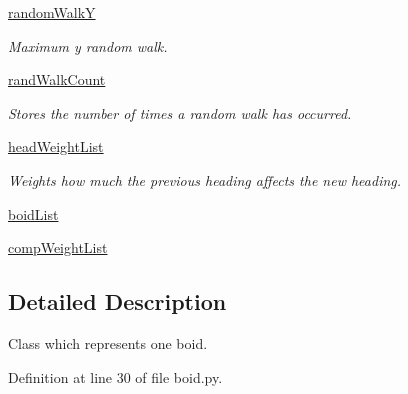 \begin{DoxyCompactItemize}
\hyperlink{classboid_1_1Boid_a1bf0149b7eadf9e6a0f08c93d95bac73}{random\-Walk\-Y}
\begin{DoxyCompactList}\small\item\em Maximum y random walk. \end{DoxyCompactList}\item 
\hyperlink{classboid_1_1Boid_af0bd96c51b17bc6c3f6fec2891b58a3d}{rand\-Walk\-Count}
\begin{DoxyCompactList}\small\item\em Stores the number of times a random walk has occurred. \end{DoxyCompactList}\item 
\hyperlink{classboid_1_1Boid_a4b192d2b077b52005a82df5d98748190}{head\-Weight\-List}
\begin{DoxyCompactList}\small\item\em Weights how much the previous heading affects the new heading. \end{DoxyCompactList}\item 
\hyperlink{classboid_1_1Boid_a6d3a16e56bd3cc7efabf9ac7cae4ae16}{boid\-List}
\item 
\hyperlink{classboid_1_1Boid_a811abb81b81e3b3e8e08e77a908ddb58}{comp\-Weight\-List}
\end{DoxyCompactItemize}


\subsection{Detailed Description}
Class which represents one boid. 

Definition at line 30 of file boid.\-py.



